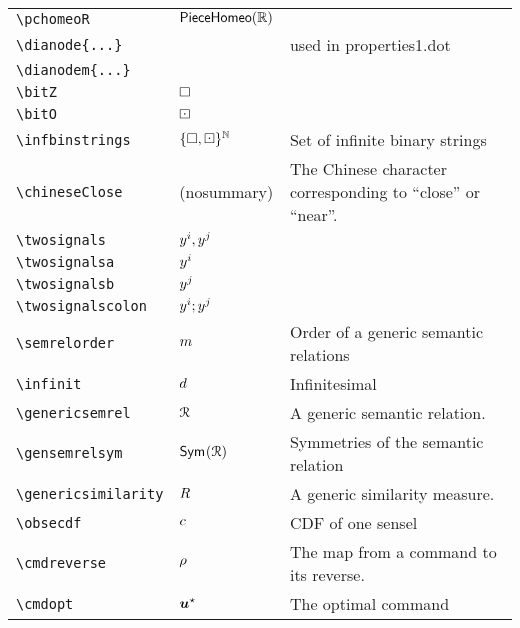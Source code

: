 \begin{longtable}{lll}
 {\color[rgb]{0.5,0.5,0.5}\texttt{\textbackslash pchomeoR}} & $\mathsf{PieceHomeo}(\mathbb{R})$ & \\ 
 {\color[rgb]{0.5,0.5,0.5}\texttt{\textbackslash dianode\{...\}}} &  &  used in properties1.dot\\ 
 {\color[rgb]{0.5,0.5,0.5}\texttt{\textbackslash dianodem\{...\}}} &  & \\ 
 {\color[rgb]{0.5,0.5,0.5}\texttt{\textbackslash bitZ}} & $\square$ & \\ 
 {\color[rgb]{0.5,0.5,0.5}\texttt{\textbackslash bitO}} & $\boxdot$ & \\ 
 {\color[rgb]{0.5,0.5,0.5}\texttt{\textbackslash infbinstrings}} & ${\{\square,\boxdot\}^\mathbb{N}}$ &  Set of infinite binary strings\\ 
 {\color[rgb]{0.5,0.5,0.5}\texttt{\textbackslash chineseClose}} & (nosummary) &  The Chinese character corresponding to ``close'' or ``near''. \\ 
 {\color[rgb]{0.5,0.5,0.5}\texttt{\textbackslash twosignals}} & $y^i,y^j$ & \\ 
 {\color[rgb]{0.5,0.5,0.5}\texttt{\textbackslash twosignalsa}} & $y^i$ & \\ 
 {\color[rgb]{0.5,0.5,0.5}\texttt{\textbackslash twosignalsb}} & $y^j$ & \\ 
 {\color[rgb]{0.5,0.5,0.5}\texttt{\textbackslash twosignalscolon}} & $y^i;y^j$ & \\ 
 {\color[rgb]{0.5,0.5,0.5}\texttt{\textbackslash semrelorder}} & $m$ &  Order of a generic semantic relations\\ 
 {\color[rgb]{0.5,0.5,0.5}\texttt{\textbackslash infinit}} & $d$ &  Infinitesimal\\ 
 {\color[rgb]{0.5,0.5,0.5}\texttt{\textbackslash genericsemrel}} & $\mathcal{R}$ &  A generic semantic relation.\\ 
 {\color[rgb]{0.5,0.5,0.5}\texttt{\textbackslash gensemrelsym}} & $\mathsf{Sym}^{}(\mathcal{R})$ &  Symmetries of the semantic relation\\ 
 {\color[rgb]{0.5,0.5,0.5}\texttt{\textbackslash genericsimilarity}} & $R$ &  A generic similarity measure.\\ 
 {\color[rgb]{0.5,0.5,0.5}\texttt{\textbackslash obsecdf}} & ${c}$ &  CDF of one sensel\\ 
 {\color[rgb]{0.5,0.5,0.5}\texttt{\textbackslash cmdreverse}} & $\rho$ &  The map from a command to its reverse.\\ 
 {\color[rgb]{0.5,0.5,0.5}\texttt{\textbackslash cmdopt}} & $\boldsymbol{u}^\star$ &  The optimal command\\ 

\end{longtable}
